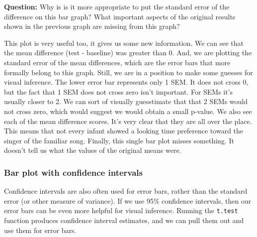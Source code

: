 \documentclass[]{book}
\begin{document}
\textbf{Question:} Why is is it more appropriate to put the standard
error of the difference on this bar graph? What important aspects of the
original results shown in the previous graph are missing from this
graph?

This plot is very useful too, it gives us some new information. We can
see that the mean difference (test - baseline) was greater than 0. And,
we are plotting the standard error of the mean differences, which are
the error bars that more formally belong to this graph. Still, we are in
a position to make some guesses for visual inference. The lower error
bar represents only 1 SEM. It does not cross 0, but the fact that 1 SEM
does not cross zero isn't important. For SEMs it's usually closer to 2.
We can sort of visually guesstimate that that 2 SEMs would not cross
zero, which would suggest we would obtain a small p-value. We also see
each of the mean difference scores. It's very clear that they are all
over the place. This means that not every infant showed a looking time
preference toward the singer of the familiar song. Finally, this single
bar plot misses something. It doesn't tell us what the values of the
original means were.

\subsubsection{Bar plot with confidence
intervals}\label{bar-plot-with-confidence-intervals}

Confidence intervals are also often used for error bars, rather than the
standard error (or other measure of variance). If we use 95\% confidence
intervals, then our error bars can be even more helpful for visual
inference. Running the \texttt{t.test} function produces confidence
interval estimates, and we can pull them out and use them for error
bars.
\end{document}
